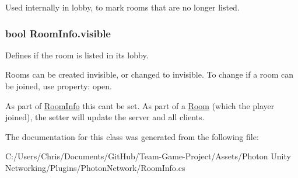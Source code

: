 Used internally in lobby, to mark rooms that are no longer listed.

\subsubsection[{\texorpdfstring{visible}{visible}}]{\setlength{\rightskip}{0pt plus 5cm}bool Room\+Info.\+visible\hspace{0.3cm}{\ttfamily [get]}}\hypertarget{class_room_info_addfd04015dca91382c6505cf0e7171f0}{}\label{class_room_info_addfd04015dca91382c6505cf0e7171f0}


Defines if the room is listed in its lobby. 

Rooms can be created invisible, or changed to invisible. To change if a room can be joined, use property\+: open. 

As part of \hyperlink{class_room_info}{Room\+Info} this can\textquotesingle{}t be set. As part of a \hyperlink{class_room}{Room} (which the player joined), the setter will update the server and all clients. 

The documentation for this class was generated from the following file\+:\begin{DoxyCompactItemize}
\item 
C\+:/\+Users/\+Chris/\+Documents/\+Git\+Hub/\+Team-\/\+Game-\/\+Project/\+Assets/\+Photon Unity Networking/\+Plugins/\+Photon\+Network/Room\+Info.\+cs\end{DoxyCompactItemize}
